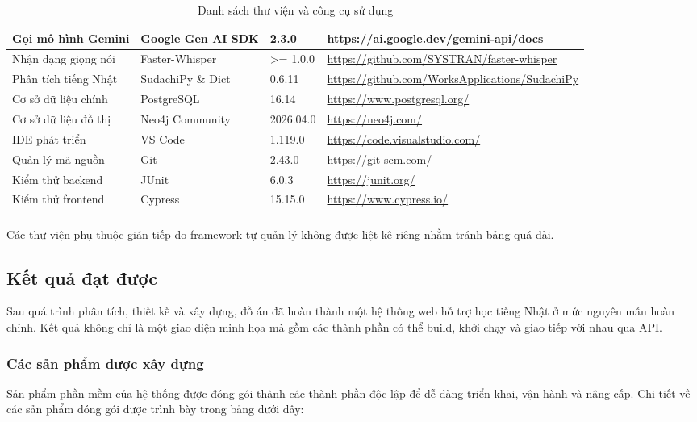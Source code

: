 \documentclass[../DoAn.tex]{subfiles}
\begin{document}
\begin{longtable}{|p{3.5cm}|p{2.5cm}|p{2.0cm}|p{5.0cm}|}
\hline
Gọi mô hình Gemini & Google Gen AI SDK & 2.3.0 & \url{https://ai.google.dev/gemini-api/docs} \\
\hline
Nhận dạng giọng nói & Faster-Whisper & >= 1.0.0 & \url{https://github.com/SYSTRAN/faster-whisper} \\
\hline
Phân tích tiếng Nhật & SudachiPy \& Dict & 0.6.11 & \url{https://github.com/WorksApplications/SudachiPy} \\
\hline
Cơ sở dữ liệu chính & PostgreSQL & 16.14 & \url{https://www.postgresql.org/} \\
\hline
Cơ sở dữ liệu đồ thị & Neo4j Community & 2026.04.0 & \url{https://neo4j.com/} \\
\hline
IDE phát triển & VS Code & 1.119.0 & \url{https://code.visualstudio.com/} \\
\hline
Quản lý mã nguồn & Git & 2.43.0 & \url{https://git-scm.com/} \\
\hline
Kiểm thử backend & JUnit & 6.0.3 & \url{https://junit.org/} \\
\hline
Kiểm thử frontend & Cypress & 15.15.0 & \url{https://www.cypress.io/} \\
\hline
\caption{Danh sách thư viện và công cụ sử dụng}
\label{table:4.10}\\
\end{longtable}

Các thư viện phụ thuộc gián tiếp do framework tự quản lý không được liệt kê riêng nhằm tránh bảng quá dài.

\subsection{Kết quả đạt được}
\label{subsection:4.3.2}

Sau quá trình phân tích, thiết kế và xây dựng, đồ án đã hoàn thành một hệ thống web hỗ trợ học tiếng Nhật ở mức nguyên mẫu hoàn chỉnh. Kết quả không chỉ là một giao diện minh họa mà gồm các thành phần có thể build, khởi chạy và giao tiếp với nhau qua API.

\subsubsection{Các sản phẩm được xây dựng}

Sản phẩm phần mềm của hệ thống được đóng gói thành các thành phần độc lập để dễ dàng triển khai, vận hành và nâng cấp. Chi tiết về các sản phẩm đóng gói được trình bày trong bảng dưới đây:
\end{document}
